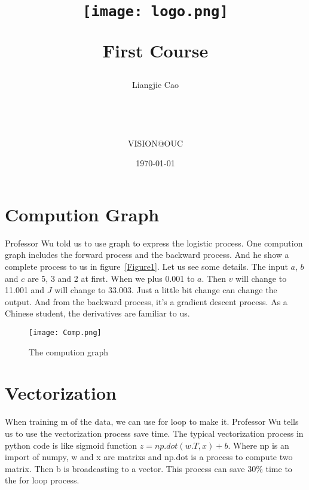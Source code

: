 \documentclass[letterpaper]{article}
\begin{document}
\title{
\begin{figure}[!htb]
 \centering
 \texttt{[image: logo.png]}\\
 \end{figure}First Course}
\author{Liangjie Cao   \\\\\\\\\\ VISION@OUC}
\date{\today}
\maketitle
\newpage
\section{Compution Graph}
Professor Wu told us to use graph to express the logistic process. One compution graph includes the forward process and the backward process. And he show a complete process to us in figure~\ref{Figure1}. Let us see some details. The input $a$, $b$ and $c$ are 5, 3 and 2 at first. When we plus 0.001 to $a$. Then $v$ will change to 11.001 and $J$ will change to 33.003. Just a little bit change can change the output. And from the backward process, it's a gradient descent process. As a Chinese student, the derivatives are familiar to us. 
\begin{figure}[!htb]
	\centering
	\texttt{[image: Comp.png]}\\
	\caption{The compution graph}
\end{figure}\label{Figure1}
\section{Vectorization}
When training m of the data, we can use for loop to make it. Professor Wu tells us to use the vectorization process save time. The typical vectorization process in python code is like sigmoid function $z=np.dot(w.T,x)+b$. Where np is an import of numpy, w and x are matrixs and np.dot is a process to compute two matrix. Then b is broadcasting to a vector. This process can save 30\% time to the for loop process. 
\end{document}
